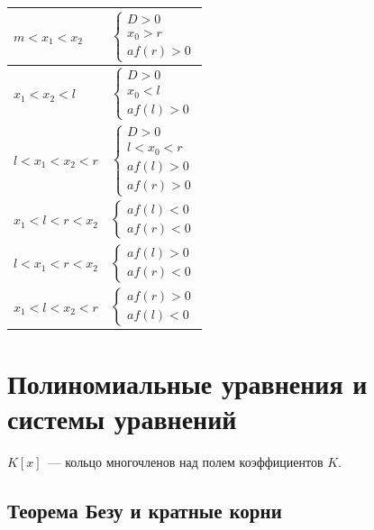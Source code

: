 \documentclass[12pt]{article}
\begin{document}
	\begin{xltabular}{\textwidth}{|X|X|}
		\hline
		$m < x_1 < x_2$ & $\begin{cases}
			D > 0\\
			x_0 > r\\
			a f(r) > 0
		\end{cases}$\\
		\hline
		$x_1 < x_2 < l$ & $\begin{cases}
			D > 0\\
			x_0 < l\\
			a f(l) > 0
		\end{cases}$\\
		\hline
		$l < x_1 < x_2 < r$ & $\begin{cases}
			D > 0\\
			l < x_0 < r\\
			a f(l) > 0\\
			a f(r) > 0
		\end{cases}$\\
		\hline
		$x_1 < l < r < x_2$ & $\begin{cases}
			a f(l) < 0\\
			a f(r) < 0
		\end{cases}$\\
		\hline
		$l < x_1 < r < x_2$ & $\begin{cases}
			a f(l) > 0\\
			a f(r) < 0
		\end{cases}$\\
		\hline
		$x_1 < l < x_2 < r$ & $\begin{cases}
			a f(r) > 0\\
			a f(l) < 0
		\end{cases}$\\
		\hline
	\end{xltabular}
	
    \section{Полиномиальные уравнения и системы уравнений}
    
    \begin{definition}
    	$K[x]$~--- кольцо многочленов над полем коэффициентов $K$.
    \end{definition}

	\subsection{Теорема Безу и кратные корни}
\end{document}
